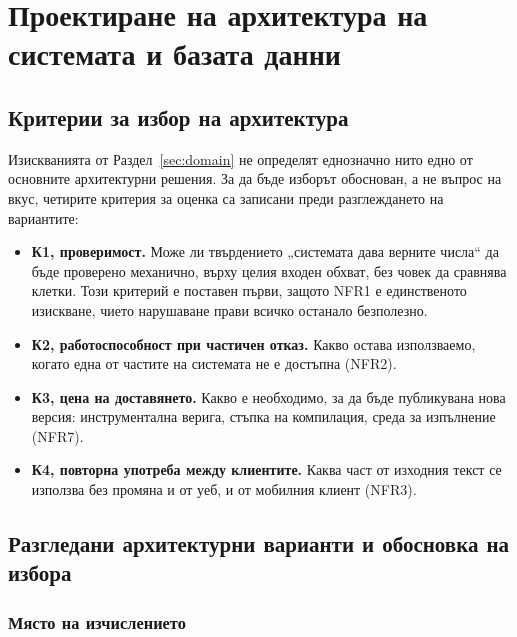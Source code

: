 \section{Проектиране на архитектура на системата и базата данни}
\label{sec:architecture}

\subsection{Критерии за избор на архитектура}
\label{subsec:criteria}

Изискванията от Раздел~\ref{sec:domain} не определят еднозначно нито едно от
основните архитектурни решения. За да бъде изборът обоснован, а не въпрос на вкус,
четирите критерия за оценка са записани преди разглеждането на вариантите:

\begin{itemize}[topsep=2pt,itemsep=2pt,leftmargin=*]
\item \textbf{К1, проверимост.} Може ли твърдението „системата дава верните числа“ да
      бъде проверено механично, върху целия входен обхват, без човек да сравнява
      клетки. Този критерий е поставен първи, защото NFR1 е единственото изискване,
      чието нарушаване прави всичко останало безполезно.
\item \textbf{К2, работоспособност при частичен отказ.} Какво остава използваемо,
      когато една от частите на системата не е достъпна (NFR2).
\item \textbf{К3, цена на доставянето.} Какво е необходимо, за да бъде публикувана нова
      версия: инструментална верига, стъпка на компилация, среда за изпълнение (NFR7).
\item \textbf{К4, повторна употреба между клиентите.} Каква част от изходния текст се
      използва без промяна и от уеб, и от мобилния клиент (NFR3).
\end{itemize}

\subsection{Разгледани архитектурни варианти и обосновка на избора}
\label{subsec:choices}

\subsubsection{Място на изчислението}
\label{subsec:where}

